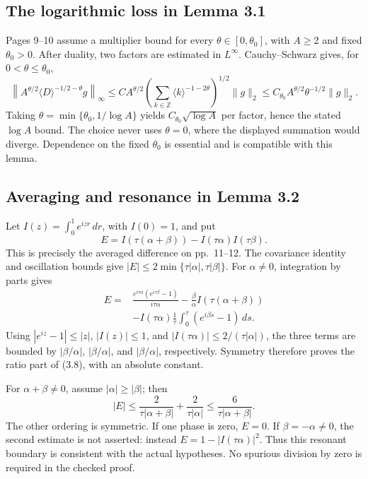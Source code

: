 \documentclass[10pt]{article}
\begin{document}
\subsection*{The logarithmic loss in Lemma 3.1}
Pages 9–10 assume a multiplier bound for every \(\theta\in[0,\theta_0]\), with \(A\ge2\) and fixed \(\theta_0>0\). After duality, two factors are estimated in \(L^\infty\). Cauchy–Schwarz gives, for \(0<\theta\le\theta_0\), \[\left\|A^{\theta/2}\langle D\rangle^{-1/2-\theta}g\right\|_\infty
 \le C A^{\theta/2}
 \left(\sum_{k\in\mathbb Z}\langle k\rangle^{-1-2\theta}\right)^{1/2}
 \|g\|_2
 \le C_{\theta_0}A^{\theta/2}\theta^{-1/2}\|g\|_2 .\] Taking \(\theta=\min\{\theta_0,1/\log A\}\) yields \(C_{\theta_0}\sqrt{\log A}\) per factor, hence the stated \(\log A\) bound. The choice never uses \(\theta=0\), where the displayed summation would diverge. Dependence on the fixed \(\theta_0\) is essential and is compatible with this lemma.\par
\subsection*{Averaging and resonance in Lemma 3.2}
Let \(I(z)=\int_0^1e^{izr}\,dr\), with \(I(0)=1\), and put \[E=I(\tau(\alpha+\beta))-I(\tau\alpha)I(\tau\beta).\] This is precisely the averaged difference on pp. 11–12. The covariance identity and oscillation bounds give \(|E|\le2\min\{\tau|\alpha|,\tau|\beta|\}\). For \(\alpha\ne0\), integration by parts gives \[\begin{aligned}
 E={}&\frac{e^{i\tau\alpha}(e^{i\tau\beta}-1)}{i\tau\alpha}
 -\frac{\beta}{\alpha}I(\tau(\alpha+\beta)) \nonumber\\
 &-I(\tau\alpha)\frac1\tau\int_0^\tau(e^{i\beta s}-1)\,ds .\end{aligned}\] Using \(|e^{iz}-1|\le |z|\), \(|I(z)|\le1\), and \(|I(\tau\alpha)|\le2/(\tau|\alpha|)\), the three terms are bounded by \(|\beta/\alpha|\), \(|\beta/\alpha|\), and \(|\beta/\alpha|\), respectively. Symmetry therefore proves the ratio part of (3.8), with an absolute constant.\par
For \(\alpha+\beta\ne0\), assume \(|\alpha|\ge|\beta|\); then \[|E|\le \frac{2}{\tau|\alpha+\beta|}
           +\frac{2}{\tau|\alpha|}
       \le\frac{6}{\tau|\alpha+\beta|}.\] The other ordering is symmetric. If one phase is zero, \(E=0\). If \(\beta=-\alpha\ne0\), the second estimate is not asserted: instead \(E=1-|I(\tau\alpha)|^2\). Thus this resonant boundary is consistent with the actual hypotheses. No spurious division by zero is required in the checked proof.\par
\end{document}
